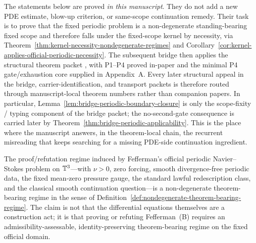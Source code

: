 \begin{tcolorbox}[title={What this bridge packet does and does not do}, colback=blue!2!white, colframe=blue!55!black]
The statements below are proved \emph{in this manuscript}. They do not add a new PDE estimate, blow-up criterion, or same-scope continuation remedy. Their task is to prove that the fixed periodic problem is a non-degenerate standing-bearing fixed scope and therefore falls under the fixed-scope kernel by necessity, via Theorem~\ref{thm:kernel-necessity-nondegenerate-regimes} and Corollary~\ref{cor:kernel-applies-official-periodic-necessity}. The subsequent bridge then applies the structural theorem packet \StructuralPacketRef{}, with P1--P4 proved in-paper and the minimal P4 gate/exhaustion core supplied in Appendix~A. Every later structural appeal in the bridge, carrier-identification, and transport packets is therefore routed through manuscript-local theorem numbers rather than companion papers. In particular, Lemma~\ref{lem:bridge-periodic-boundary-closure} is only the scope-fixity / typing component of the bridge packet; the no-second-gate consequence is carried later by Theorem~\ref{thm:bridge-periodic-applicability}. This is the place where the manuscript answers, in the theorem-local chain, the recurrent misreading that keeps searching for a missing PDE-side continuation ingredient.
\end{tcolorbox}


\begin{manualtheorem}
\label{thm:official-periodic-ns-nondegenerate}
The proof/refutation regime induced by Fefferman's official periodic Navier--Stokes problem on $\mathbb{T}^3$---with $\nu>0$, zero forcing, smooth divergence-free periodic data, the fixed mean-zero pressure gauge, the standard lawful redescription class, and the classical smooth continuation question---is a non-degenerate theorem-bearing regime in the sense of Definition~\ref{def:nondegenerate-theorem-bearing-regime}. The claim is not that the differential equations themselves are a construction act; it is that proving or refuting Fefferman~(B) requires an admissibility-assessable, identity-preserving theorem-bearing regime on the fixed official domain.
\end{manualtheorem}


